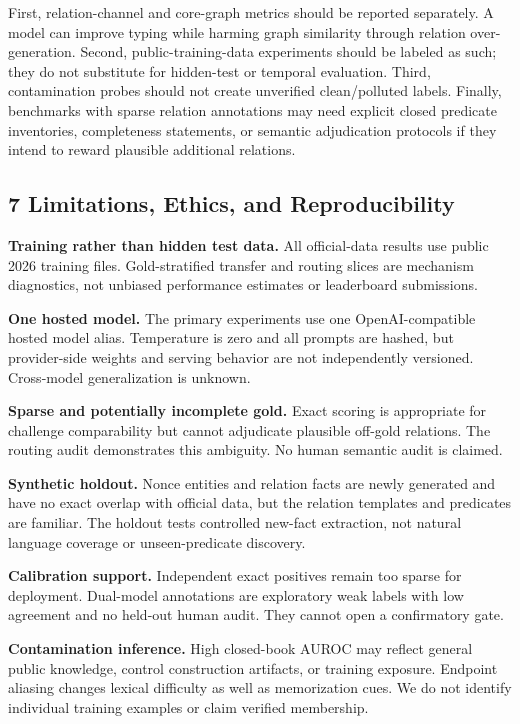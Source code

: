 \documentclass[
]{article}
\begin{document}
First, relation-channel and core-graph metrics should be reported
separately. A model can improve typing while harming graph similarity
through relation over-generation. Second, public-training-data
experiments should be labeled as such; they do not substitute for
hidden-test or temporal evaluation. Third, contamination probes should
not create unverified clean/polluted labels. Finally, benchmarks with
sparse relation annotations may need explicit closed predicate
inventories, completeness statements, or semantic adjudication protocols
if they intend to reward plausible additional relations.

\subsection{7 Limitations, Ethics, and
Reproducibility}\label{limitations-ethics-and-reproducibility}

\textbf{Training rather than hidden test data.} All official-data
results use public 2026 training files. Gold-stratified transfer and
routing slices are mechanism diagnostics, not unbiased performance
estimates or leaderboard submissions.

\textbf{One hosted model.} The primary experiments use one
OpenAI-compatible hosted model alias. Temperature is zero and all
prompts are hashed, but provider-side weights and serving behavior are
not independently versioned. Cross-model generalization is unknown.

\textbf{Sparse and potentially incomplete gold.} Exact scoring is
appropriate for challenge comparability but cannot adjudicate plausible
off-gold relations. The routing audit demonstrates this ambiguity. No
human semantic audit is claimed.

\textbf{Synthetic holdout.} Nonce entities and relation facts are newly
generated and have no exact overlap with official data, but the relation
templates and predicates are familiar. The holdout tests controlled
new-fact extraction, not natural language coverage or unseen-predicate
discovery.

\textbf{Calibration support.} Independent exact positives remain too
sparse for deployment. Dual-model annotations are exploratory weak
labels with low agreement and no held-out human audit. They cannot open
a confirmatory gate.

\textbf{Contamination inference.} High closed-book AUROC may reflect
general public knowledge, control construction artifacts, or training
exposure. Endpoint aliasing changes lexical difficulty as well as
memorization cues. We do not identify individual training examples or
claim verified membership.
\end{document}
